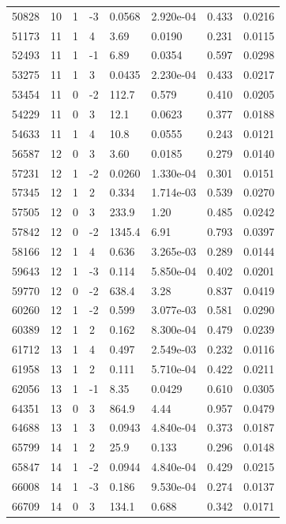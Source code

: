 \documentclass[preview]{standalone}
\begin{document}
{{{\begin{tabular}{L{1.2cm}C{1.2cm} C{0.3cm}C{0.5cm} C{1.4cm}C{1.4cm} C{1.4cm}C{1.4cm}}
  50828  &    10  & 1     & -3 &  0.0568  & 2.920e-04  & 0.433 &  0.0216   \\ 
  51173  &    11  & 1     &  4 &  3.69  & 0.0190  & 0.231 &  0.0115   \\ 
  52493  &    11  & 1     & -1 &  6.89  & 0.0354  & 0.597 &  0.0298   \\ 
  53275  &    11  & 1     &  3 &  0.0435  & 2.230e-04  & 0.433 &  0.0217   \\ 
  53454  &    11  & 0     & -2 &  112.7  & 0.579  & 0.410 &  0.0205   \\ 
  54229  &    11  & 0     &  3 &  12.1  & 0.0623  & 0.377 &  0.0188   \\ 
  54633  &    11  & 1     &  4 &  10.8  & 0.0555  & 0.243 &  0.0121   \\ 
  56587  &    12  & 0     &  3 &  3.60  & 0.0185  & 0.279 &  0.0140   \\ 
  57231  &    12  & 1     & -2 &  0.0260  & 1.330e-04  & 0.301 &  0.0151   \\ 
  57345  &    12  & 1     &  2 &  0.334  & 1.714e-03  & 0.539 &  0.0270   \\ 
  57505  &    12  & 0     &  3 &  233.9  & 1.20  & 0.485 &  0.0242   \\ 
  57842  &    12  & 0     & -2 &  1345.4  & 6.91  & 0.793 &  0.0397   \\ 
  58166  &    12  & 1     &  4 &  0.636  & 3.265e-03  & 0.289 &  0.0144   \\ 
  59643  &    12  & 1     & -3 &  0.114  & 5.850e-04  & 0.402 &  0.0201   \\ 
  59770  &    12  & 0     & -2 &  638.4  & 3.28  & 0.837 &  0.0419   \\ 
  60260  &    12  & 1     & -2 &  0.599  & 3.077e-03  & 0.581 &  0.0290   \\ 
  60389  &    12  & 1     &  2 &  0.162  & 8.300e-04  & 0.479 &  0.0239   \\ 
  61712  &    13  & 1     &  4 &  0.497  & 2.549e-03  & 0.232 &  0.0116   \\ 
  61958  &    13  & 1     &  2 &  0.111  & 5.710e-04  & 0.422 &  0.0211   \\ 
  62056  &    13  & 1     & -1 &  8.35  & 0.0429  & 0.610 &  0.0305   \\ 
  64351  &    13  & 0     &  3 &  864.9  & 4.44  & 0.957 &  0.0479   \\ 
  64688  &    13  & 1     &  3 &  0.0943  & 4.840e-04  & 0.373 &  0.0187   \\ 
  65799  &    14  & 1     &  2 &  25.9  & 0.133  & 0.296 &  0.0148   \\ 
  65847  &    14  & 1     & -2 &  0.0944  & 4.840e-04  & 0.429 &  0.0215   \\ 
  66008  &    14  & 1     & -3 &  0.186  & 9.530e-04  & 0.274 &  0.0137   \\ 
  66709  &    14  & 0     &  3 &  134.1  & 0.688  & 0.342 &  0.0171   \\ 
\hline 
\end{tabular} 

}}}
\end{document}
